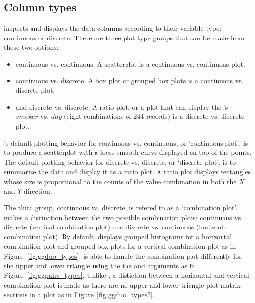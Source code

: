 \documentclass[stat,dissertation]{puthesis}\usepackage[]{graphicx}\usepackage{xcolor}
\begin{document}
\subsection{Column types}

 inspects and displays the data columns according to their variable type: continuous or discrete. There are three plot type groups that can be made from these two options:
\begin{itemize}
  \item continuous vs. continuous. A scatterplot is a continuous vs. continuous plot.
  \item continuous vs. discrete.  A box plot or grouped box plots is a continuous vs. discrete plot.
  \item and discrete vs. discrete. A ratio plot, or a plot that can display the 's $smoker$ vs. $day$ (eight combinations of 244 records) is a discrete vs. discrete plot.
\end{itemize}


's default plotting behavior for continuous vs. continuous, or `continuous plot', is to produce a scatterplot with a loess smooth curve displayed on top of the points.
The default plotting behavior for discrete vs. discrete, or `discrete plot', is to summarize the data and display it as a ratio plot.  A ratio plot displays rectangles whose size is proportional to the counts of the value combination in both the $X$ and $Y$ direction.


The third group, continuous vs. discrete, is refered to as a `combination plot'.  makes a distinction between the two possible combination plots: continuous vs. discrete (vertical combination plot) and discrete vs. continuous (horizontal combination plot). By default,  displays grouped histograms for a horizontal combination plot and grouped box plots for a vertical combination plot as in Figure~\ref{fig:ggduo_types}.
 is able to handle the combination plot differently for the upper and lower triangle using the the  and  arguments as in Figure~\ref{fig:ggpairs_types}.  Unlike , a distiction between a horizontal and vertical combination plot is made as there are no upper and lower triangle plot matrix sections in a  plot as in Figure~\ref{fig:ggduo_types2}.
\end{document}
